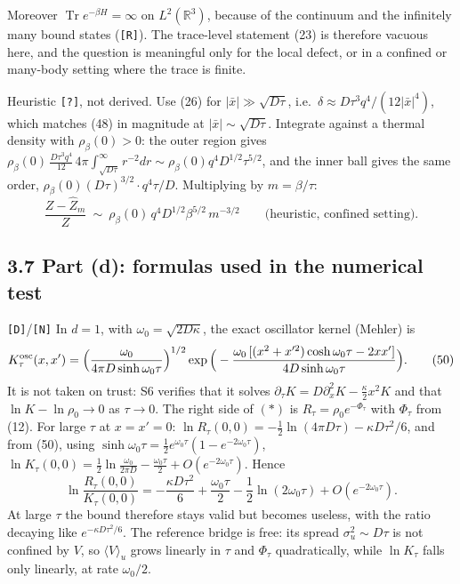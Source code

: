 \documentclass[11pt,a4paper]{article}
\begin{document}
Moreover \(\operatorname{Tr}e^{-\beta H}=\infty\) on \(L^2(\mathbb R^3)\), because of the continuum and the infinitely many bound states (\texttt{[R]}). The trace-level statement (23) is therefore vacuous here, and the question is meaningful only for the local defect, or in a confined or many-body setting where the trace is finite.

Heuristic \texttt{[?]}, not derived. Use (26) for \(|\bar x|\gg\sqrt{D\tau}\), i.e.~\(\delta\approx D\tau^3q^4/(12|\bar x|^4)\), which matches (48) in magnitude at \(|\bar x|\sim\sqrt{D\tau}\). Integrate against a thermal density with \(\rho_\beta(0)>0\): the outer region gives \(\rho_\beta(0)\,\frac{D\tau^3q^4}{12}\,4\pi\int_{\sqrt{D\tau}}^\infty r^{-2}dr\sim\rho_\beta(0)q^4D^{1/2}\tau^{5/2}\), and the inner ball gives the same order, \(\rho_\beta(0)(D\tau)^{3/2}\cdot q^4\tau/D\). Multiplying by \(m=\beta/\tau\):
\[\frac{Z-\hat Z_m}{Z}\ \sim\ \rho_\beta(0)\,q^4D^{1/2}\beta^{5/2}\,m^{-3/2}\qquad\text{(heuristic, confined setting).}\tag{49}\]

\hypertarget{part-d-formulas-used-in-the-numerical-test}{%
\subsection{3.7 Part (d): formulas used in the numerical test}\label{part-d-formulas-used-in-the-numerical-test}}

\texttt{[D]}/\texttt{[N]} In \(d=1\), with \(\omega_0=\sqrt{2D\kappa}\), the exact oscillator kernel (Mehler) is
\[K^{\rm osc}_\tau(x,x')=\Big(\frac{\omega_0}{4\pi D\sinh\omega_0\tau}\Big)^{1/2}\exp\Big(-\frac{\omega_0\,[(x^2+x'^2)\cosh\omega_0\tau-2xx']}{4D\sinh\omega_0\tau}\Big).\tag{50}\]
It is not taken on trust: S6 verifies that it solves \(\partial_\tau K=D\partial_x^2K-\tfrac\kappa2x^2K\) and that \(\ln K-\ln\rho_0\to0\) as \(\tau\to0\). The right side of \((\ast)\) is \(R_\tau=\rho_0e^{-\Phi_\tau}\) with \(\Phi_\tau\) from (12). For large \(\tau\) at \(x=x'=0\): \(\ln R_\tau(0,0)=-\tfrac12\ln(4\pi D\tau)-\kappa D\tau^2/6\), and from (50), using \(\sinh\omega_0\tau=\tfrac12e^{\omega_0\tau}(1-e^{-2\omega_0\tau})\), \(\ln K_\tau(0,0)=\tfrac12\ln\frac{\omega_0}{2\pi D}-\frac{\omega_0\tau}2+O(e^{-2\omega_0\tau})\). Hence
\[\ln\frac{R_\tau(0,0)}{K_\tau(0,0)}=-\frac{\kappa D\tau^2}{6}+\frac{\omega_0\tau}{2}-\frac12\ln(2\omega_0\tau)+O(e^{-2\omega_0\tau}).\tag{51}\]
At large \(\tau\) the bound therefore stays valid but becomes useless, with the ratio decaying like \(e^{-\kappa D\tau^2/6}\). The reference bridge is free: its spread \(\sigma_u^2\sim D\tau\) is not confined by \(V\), so \(\langle V\rangle_u\) grows linearly in \(\tau\) and \(\Phi_\tau\) quadratically, while \(\ln K_\tau\) falls only linearly, at rate \(\omega_0/2\).
\end{document}
